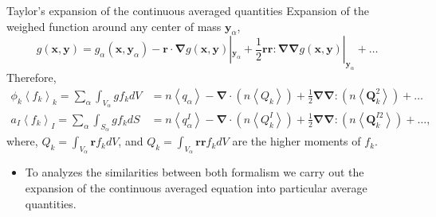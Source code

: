 \documentclass{sintefbeamer}
\newcommand{\kavg}[1]{\left<#1\right>_k}
\newcommand{\Iavg}[1]{\left<#1\right>_I}
\newcommand{\pavg}[1]{n \left<#1\right>}
\newcommand{\nablab}{\bm{\nabla}}
\begin{document}
\begin{frame}{Taylor's expansion of the continuous averaged quantities}
Expansion of the weighed function around any center of mass $\textbf{y}_\alpha$,
\begin{equation*}
    g(\textbf{x},\textbf{y})
    = g_\alpha(\textbf{x},\textbf{y}_\alpha)
    - \textbf{r} \cdot \nablab g(\textbf{x},\textbf{y})|_{\textbf{y}_\alpha}
    + \frac{1}{2} \textbf{r}\textbf{r} : \nablab\nablab g(\textbf{x},\textbf{y})|_{\textbf{y}_\alpha}
    + \ldots
\end{equation*} 
Therefore,
\begin{align*}
  \phi_k \kavg{f_k} = \sum_\alpha \int_{V_\alpha} g f_k dV 
  &=  \pavg{q_\alpha}        
      - \nablab \cdot  \left
      (\pavg{Q_k}\right)        
      + \frac{1}{2} \nablab\nablab : \left(\pavg{\textbf{Q}_k^2}\right)
      + \ldots  \\
  a_I \Iavg{f_k} = \sum_\alpha \int_{S_\alpha} g f_k dS 
  &=  \pavg{q_\alpha^I}        
      - \nablab \cdot  \left(\pavg{Q_k^I}\right)        
      + \frac{1}{2} \nablab\nablab : \left(\pavg{\textbf{Q}_k^{I2}}\right)
      + \ldots,
\end{align*}  
where, $Q_k = \int_{V_\alpha} \textbf{r} f_k dV$, and $Q_k = \int_{V_\alpha} \textbf{r} \textbf{r} f_k dV$  are the higher moments of $f_k$.
\begin{itemize}
  \item To analyzes the similarities between both formalism we carry out the expansion of the continuous averaged equation into particular average quantities. 
\end{itemize}
\end{frame}
\end{document}
